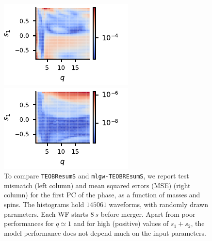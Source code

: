 \documentclass[twocolumn,showpacs,preprintnumbers,nofootinbib,prd,
superscriptaddress,10pt]{revtex4-1}
\begin{document}
\begin{figure}[t]
\begin{minipage}{\linewidth}
\begin{minipage}{\minipagesize\linewidth}
		    \includegraphics[width=\linewidth]{img/F_countour_q_s1.pdf}
		\end{minipage}\hfill
		\begin{minipage}{\minipagesize\linewidth}
		    \centering
		    \includegraphics[width=\linewidth]{img/mse_countour_q_s1.pdf}
		\end{minipage}
    \end{minipage}
	\caption{To compare \texttt{TEOBResumS} and \texttt{mlgw-TEOBREsumS}, we report test mismatch (left column) and mean squared errors (MSE) (right column) for the first PC of the phase, as a function of masses and spins. The histograms hold $145061$ waveforms, with randomly drawn parameters.
	Each WF starts $\SI{8}{s}$ before merger.
	Apart from poor performances for ${q\simeq 1}$ and for high (positive) values of $s_1+s_2$, the model performance does not depend much on the input parameters.
}
	\label{fig:countour}
\end{figure}
\end{document}
